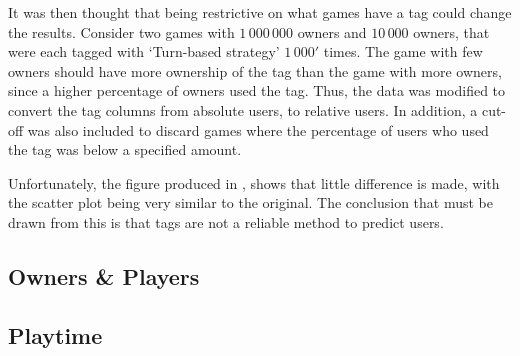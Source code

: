 \documentclass[dataset.tex]{subfiles}
\begin{document}
It was then thought that being restrictive on what games have a tag could change
the results. Consider two games with \(1\,000\,000\) owners and \(10\,000\)
owners, that were each tagged with `Turn-based strategy' \(1\,000'\) times. The
game with few owners should have more ownership of the tag than the game with
more owners, since a higher percentage of owners used the tag. Thus, the data
was modified to convert the tag columns from absolute users, to relative users.
In addition, a cut-off was also included to discard games where the percentage
of users who used the tag was below a specified amount.

Unfortunately, the figure produced in , shows that
little difference is made, with the scatter plot being very similar to the
original. The conclusion that must be drawn from this is that tags are not a
reliable method to predict users.

\subsection{Owners \& Players} %
\label{sub:owners_players}


\subsection{Playtime} %
\label{sub:playtime}

\end{document}
